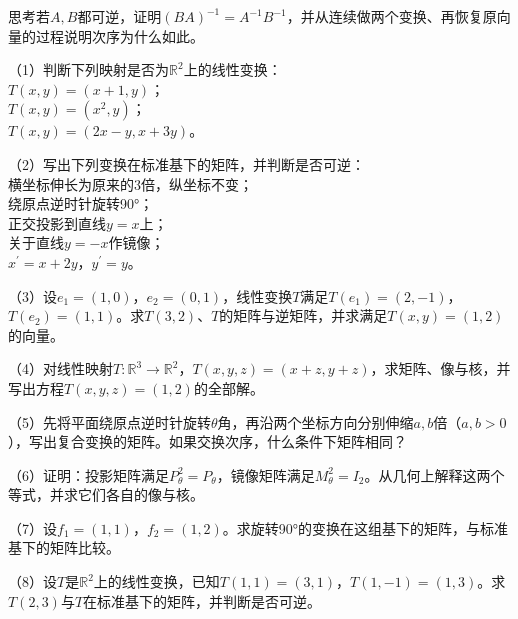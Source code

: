 {\kaiti{}思考\quad 若\(A , B\)都可逆，证明\(\left( B A \right)^{- 1} = A^{- 1} B^{- 1}\)，并从连续做两个变换、再恢复原向量的过程说明次序为什么如此。}

\begin{exercise}
（1）判断下列映射是否为\(\mathbb{R}^{2}\)上的线性变换：\\
\(T \left( x , y \right) = \left( x + 1 , y \right)\)；\\
\(T \left( x , y \right) = \left( x^{2} , y \right)\)；\\
\(T \left( x , y \right) = \left( 2 x - y , x + 3 y \right)\)。

（2）写出下列变换在标准基下的矩阵，并判断是否可逆：\\
横坐标伸长为原来的\(3\)倍，纵坐标不变；\\
绕原点逆时针旋转90°；\\
正交投影到直线\(y = x\)上；\\
关于直线\(y = - x\)作镜像；\\
\(x^{\prime} = x + 2 y\)，\(y^{\prime} = y\)。

（3）设\(e_{1} = \left( 1 , 0 \right)\)，\(e_{2} = \left( 0 , 1 \right)\)，线性变换\(T\)满足\(T \left( e_{1} \right) = \left( 2 , - 1 \right)\)，\(T \left( e_{2} \right) = \left( 1 , 1 \right)\)。求\(T \left( 3 , 2 \right)\)、\(T\)的矩阵与逆矩阵，并求满足\(T \left( x , y \right) = \left( 1 , 2 \right)\)的向量。

（4）对线性映射\(T : \mathbb{R}^{3} \longrightarrow \mathbb{R}^{2}\)，\(T \left( x , y , z \right) = \left( x + z , y + z \right)\)，求矩阵、像与核，并写出方程\(T \left( x , y , z \right) = \left( 1 , 2 \right)\)的全部解。

\begin{samepage}
（5）先将平面绕原点逆时针旋转\(\theta\)角，再沿两个坐标方向分别伸缩\(a , b\)倍（\(a , b > 0\)），写出复合变换的矩阵。如果交换次序，什么条件下矩阵相同？
\par
\end{samepage}

（6）证明：投影矩阵满足\(P_{\theta}^{2} = P_{\theta}\)，镜像矩阵满足\(M_{\theta}^{2} = I_{2}\)。从几何上解释这两个等式，并求它们各自的像与核。

（7）设\(f_{1} = \left( 1 , 1 \right)\)，\(f_{2} = \left( 1 , 2 \right)\)。求旋转90°的变换在这组基下的矩阵，与标准基下的矩阵比较。

（8）设\(T\)是\(\mathbb{R}^{2}\)上的线性变换，已知\(T \left( 1 , 1 \right) = \left( 3 , 1 \right)\)，\(T \left( 1 , - 1 \right) = \left( 1 , 3 \right)\)。求\(T \left( 2 , 3 \right)\)与\(T\)在标准基下的矩阵，并判断是否可逆。


\end{exercise}
